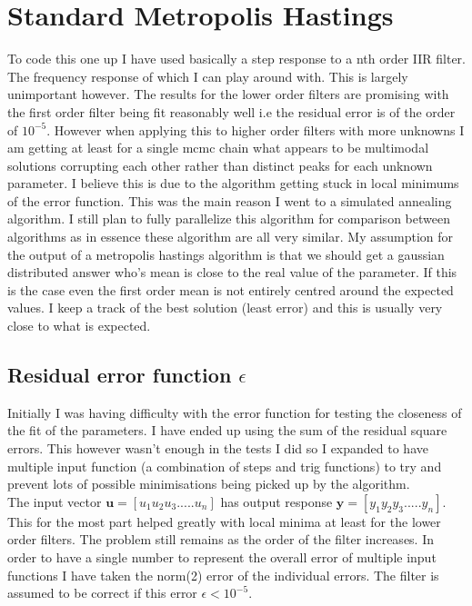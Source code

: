 \documentclass[12pt]{article}
\begin{document}
\section{Standard Metropolis Hastings}
To code this one up I have used basically a step response to a nth order IIR filter. The frequency response of which I can play around with. This is largely unimportant however. The results for the lower order filters are promising with the first order filter being fit reasonably well i.e the residual error is of the order of $10^{-5}$. However when applying this to higher order filters with more unknowns I am getting at least for a single mcmc chain what appears to be multimodal solutions corrupting each other rather than distinct peaks for each unknown parameter. I believe this is due to the algorithm getting stuck in local minimums of the error function. This was the main reason I went to a simulated annealing algorithm. I still plan to fully parallelize this algorithm for comparison between algorithms as in essence these algorithm are all very similar. My assumption for the output of a metropolis hastings algorithm is that we should get a gaussian distributed answer who's mean is close to the real value of the parameter. If this is the case even the first order mean is not entirely centred around the expected values. I keep a track of the best solution (least error) and this is usually very close to what is expected.
\subsection{Residual error function $\epsilon$}
Initially I was having difficulty with the error function for testing the closeness of the fit of the parameters. I have ended up using the sum of the residual square errors. This however wasn't enough in the tests I did so I expanded to have multiple input function (a combination of steps and trig functions) to try and prevent lots of possible minimisations being picked up by the algorithm.\\
The input vector $\mathbf{u} = [u_1 u_2 u_3.....u_n]$ has output response $\mathbf{y} = [y_1 y_2 y_3.....y_n]$. This for the most part helped greatly with local minima at least for the lower order filters. The problem still remains as the order of the filter increases. In order to have a single number to represent the overall error of multiple input functions I have taken the norm(2) error of the individual errors. The filter is assumed to be correct if this error $\epsilon < 10^{-5}$.
\end{document}
